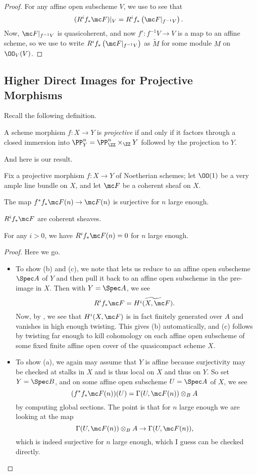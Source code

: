 \documentclass[../notes.tex]{subfiles}
\begin{document}
\begin{proof}
	For any affine open subscheme $V$, we use  to see that
	\[(R^if_*\mc F)|_V=R^if_*\left(\mc F|_{f^{-1}V}\right).\]
	Now, $\mc F|_{f^{-1}V}$ is quasicoherent, and now $f'\colon f^{-1}V\to V$ is a map to an affine scheme, so we use  to write $R^if_*\left(\mc F|_{f^{-1}V}\right)$ as $\widetilde M$ for some module $M$ on $\OO_V(V)$.
\end{proof}

\subsection{Higher Direct Images for Projective Morphisms}
Recall the following definition.
\begin{definition}[projective]
	A scheme morphism $f\colon X\to Y$ is \textit{projective} if and only if it factors through a closed immersion into $\PP^n_Y=\PP^n_\ZZ\times_\ZZ Y$ followed by the projection to $Y$.
\end{definition}
And here is our result.
\begin{theorem}
	Fix a projective morphism $f\colon X\to Y$ of Noetherian schemes; let $\OO(1)$ be a very ample line bundle on $X$, and let $\mc F$ be a coherent sheaf on $X$.
	\begin{listalph}
		\item The map $f^*f_*\mc F(n)\to\mc F(n)$ is surjective for $n$ large enough.
		\item $R^if_*\mc F$ are coherent sheaves.
		\item For any $i>0$, we have $R^if_*\mc F(n)=0$ for $n$ large enough.
	\end{listalph}
\end{theorem}
\begin{proof}
	Here we go.
	\begin{itemize}
		\item To show (b) and (c), we note that  lets us reduce to an affine open subscheme $\Spec A$ of $Y$ and then pull it back to an affine open subscheme in the pre-image in $X$. Then with $Y=\Spec A$, we see
		\[R^if_*\mc F=\widetilde{H^i(X,\mc F)}.\]
		Now, by , we see that $H^i(X,\mc F)$ is in fact finitely generated over $A$ and vanishes in high enough twisting. This gives (b) automatically, and (c) follows by twisting far enough to kill cohomology on each affine open subscheme of some fixed finite affine open cover of the quasicompact scheme $X$.
		\item To show (a), we again may assume that $Y$ is affine because surjectivity may be checked at stalks in $X$ and is thus local on $X$ and thus on $Y$. So set $Y=\Spec B$, and on some affine open subscheme $U=\Spec A$ of $X$, we see
		\[(f^*f_*\mc F(n))(U)=\Gamma(U,\mc F(n))\otimes_BA\]
		by computing global sections. The point is that for $n$ large enough we are looking at the map
		\[\Gamma(U,\mc F(n))\otimes_BA\to\Gamma(U,\mc F(n)),\]
		which is indeed surjective for $n$ large enough, which I guess can be checked directly.
		\qedhere
	\end{itemize}
\end{proof}
\end{document}
